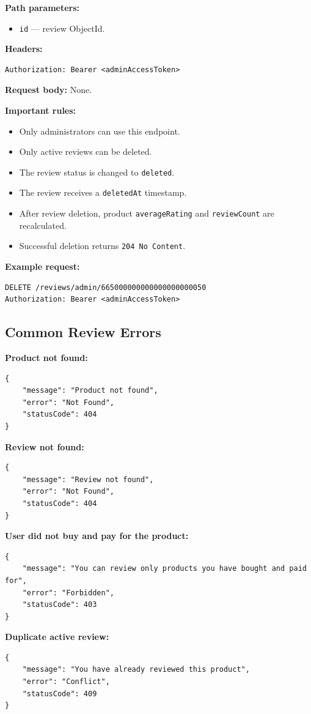 \textbf{Path parameters:}

\begin{itemize}
    \item \texttt{id} --- review ObjectId.
\end{itemize}

\textbf{Headers:}

\begin{verbatim}
Authorization: Bearer <adminAccessToken>
\end{verbatim}

\textbf{Request body:} None.

\textbf{Important rules:}

\begin{itemize}
    \item Only administrators can use this endpoint.
    \item Only active reviews can be deleted.
    \item The review status is changed to \texttt{deleted}.
    \item The review receives a \texttt{deletedAt} timestamp.
    \item After review deletion, product \texttt{averageRating} and \texttt{reviewCount} are recalculated.
    \item Successful deletion returns \texttt{204 No Content}.
\end{itemize}

\textbf{Example request:}

\begin{verbatim}
DELETE /reviews/admin/665000000000000000000050
Authorization: Bearer <adminAccessToken>
\end{verbatim}

\subsection{Common Review Errors}

\textbf{Product not found:}

\begin{verbatim}
{
    "message": "Product not found",
    "error": "Not Found",
    "statusCode": 404
}
\end{verbatim}

\textbf{Review not found:}

\begin{verbatim}
{
    "message": "Review not found",
    "error": "Not Found",
    "statusCode": 404
}
\end{verbatim}

\textbf{User did not buy and pay for the product:}

\begin{verbatim}
{
    "message": "You can review only products you have bought and paid for",
    "error": "Forbidden",
    "statusCode": 403
}
\end{verbatim}

\textbf{Duplicate active review:}

\begin{verbatim}
{
    "message": "You have already reviewed this product",
    "error": "Conflict",
    "statusCode": 409
}
\end{verbatim}